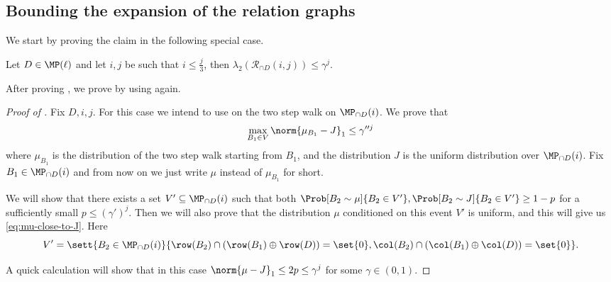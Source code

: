 \subsection{Bounding the expansion of the relation graphs}
We start by proving the claim in the following special case.
\begin{claim} \label{claim:lower-bound-relation-i-small}
    Let \(D \in \MP(\ell)\) and let \(i,j\) be such that \(i \leq \frac{j}{3}\), then 
    \(\lambda_2(\mathcal{R}_{\cap D}(i,j)) \leq \gamma^{ j}.\)
\end{claim}

After proving , we prove  by using  again.

\begin{proof}[Proof of ]
    Fix \(D,i,j\). For this case we intend to use  on the two step walk on \(\MP_{\cap D}(i)\). We prove that 
\begin{equation} \label{eq:mu-close-to-J}
    \max_{B_1 \in V} \norm{\mu_{B_1} - J}_1 \leq \gamma''^{j}
\end{equation}
where \(\mu_{B_1}\) is the distribution of the two step walk starting from \(B_1\), and the distribution \(J\) is the uniform distribution over \(\MP_{\cap D}(i)\). Fix \(B_1 \in \MP_{\cap D}(i)\) and from now on we just write \(\mu\) instead of \(\mu_{B_1}\) for short. 

We will show that there exists a set \(V' \subseteq \MP_{\cap D}(i)\) such that both \(\Prob[B_2 \sim \mu]{B_2 \in V'}, \Prob[B_2 \sim J]{B_2 \in V'} \geq 1-p\) for a sufficiently small \(p \leq (\gamma')^{j}\). Then we will also prove that the distribution \(\mu\) conditioned on this event \(V'\) is uniform, and this will give us \eqref{eq:mu-close-to-J}. Here 
\[V' = \sett{B_2 \in \MP_{\cap D}(i)}{\row(B_2) \cap (\row(B_1) \oplus \row(D)) = \set{0},  \col(B_2)\cap (\col(B_1) \oplus \col(D)) = \set{0}}.\]

A quick calculation will show that in this case \(\norm{\mu - J}_1 \leq 2p \leq \gamma^{j}\) for some \(\gamma \in (0,1)\).


\end{proof}
